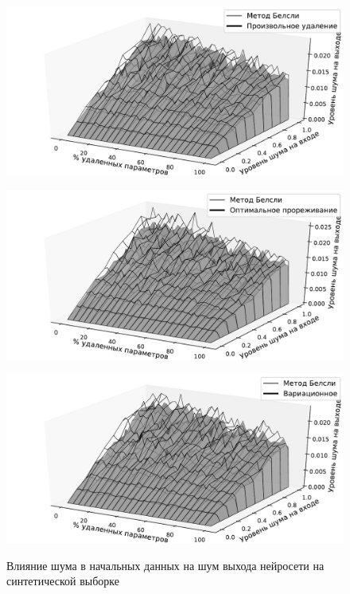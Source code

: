 \begin{figure}[h!t]\center
\begin{minipage}[t]{.45\textwidth}
{\includegraphics[width=\textwidth]{plots/grabovoy/Data1/RandomNoise3D.pdf}}
\end{minipage}
\begin{minipage}[t]{.45\textwidth}
{\includegraphics[width=\textwidth]{plots/grabovoy/Data1/OBDNoise3D.pdf}}
\end{minipage}

\begin{minipage}[t]{.45\textwidth}
{\includegraphics[width=\textwidth]{plots/grabovoy/Data1/VariationalNoise3D.pdf}}
\end{minipage}

\caption{Влияние шума в начальных данных на шум выхода нейросети на синтетической выборке}
\label{Data1Noise}
\end{figure}


